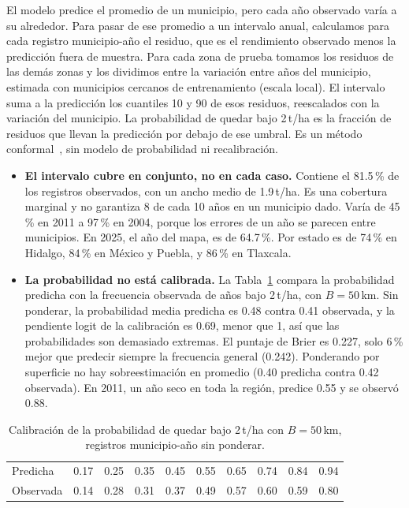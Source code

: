 El modelo predice el promedio de un municipio, pero cada año observado varía a su alrededor. Para pasar de ese
promedio a un intervalo anual, calculamos para cada registro municipio-año el residuo, que es el rendimiento observado
menos la predicción fuera de muestra. Para cada zona de prueba tomamos los residuos de las demás zonas y los dividimos
entre la variación entre años del municipio, estimada con municipios cercanos de entrenamiento (escala local). El
intervalo suma a la predicción los cuantiles 10 y 90 de esos residuos, reescalados con la variación del municipio. La
probabilidad de quedar bajo 2\,t/ha es la fracción de residuos que llevan la predicción por debajo de ese umbral. Es
un método conformal~\cite{lei2018,angelopoulos2023}, sin modelo de probabilidad ni recalibración.
\begin{itemize}
\item \textbf{El intervalo cubre en conjunto, no en cada caso.} Contiene el 81.5\,\% de los registros observados, con
un ancho medio de 1.9\,t/ha. Es una cobertura marginal y no garantiza 8 de cada 10 años en un municipio dado. Varía
de 45\,\% en 2011 a 97\,\% en 2004, porque los errores de un año se parecen entre municipios. En 2025, el año del
mapa, es de 64.7\,\%. Por estado es de 74\,\% en Hidalgo, 84\,\% en México y Puebla, y 86\,\% en Tlaxcala.
\item \textbf{La probabilidad no está calibrada.} La Tabla~\ref{tab:calib} compara la probabilidad predicha con la
frecuencia observada de años bajo 2\,t/ha, con $B = 50$\,km. Sin ponderar, la probabilidad media predicha es 0.48
contra 0.41 observada, y la pendiente logit de la calibración es 0.69, menor que 1, así que las probabilidades son
demasiado extremas. El puntaje de Brier es 0.227, solo 6\,\% mejor que predecir siempre la frecuencia general
(0.242). Ponderando por superficie no hay sobreestimación en promedio (0.40 predicha contra 0.42 observada). En 2011,
un año seco en toda la región, predice 0.55 y se observó 0.88.
\end{itemize}

\begin{table}[!tbp]
\centering
\caption{Calibración de la probabilidad de quedar bajo 2\,t/ha con $B = 50$\,km, registros municipio-año sin
ponderar.}
\label{tab:calib}
\footnotesize
\setlength{\tabcolsep}{3pt}
\begin{tabular}{@{}lccccccccc@{}}
\toprule
Predicha & 0.17 & 0.25 & 0.35 & 0.45 & 0.55 & 0.65 & 0.74 & 0.84 & 0.94 \\
Observada & 0.14 & 0.28 & 0.31 & 0.37 & 0.49 & 0.57 & 0.60 & 0.59 & 0.80 \\
\bottomrule
\end{tabular}
\end{table}

